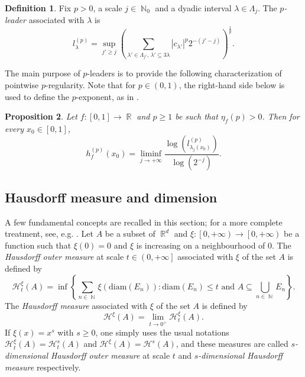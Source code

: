 \documentclass[a4paper,11pt,oneside]{article}
\DeclareMathOperator{\R}{\mathbb{R}}
\DeclareMathOperator{\N}{\mathbb{N}}
\newcommand{\coint}[1]{\left[{#1}\right)}
\newcommand{\ccint}[1]{\left[{#1}\right]}
\newcommand{\ocint}[1]{\left({#1}\right]}
\newcommand{\modu}[1]{\left\vert{#1}\right\vert}
\theoremstyle{definition}
\newtheorem{defi}{Definition}[section]
\theoremstyle{plain}
\newtheorem{prop}[defi]{Proposition}
\begin{document}
\begin{defi}
Fix $p>0$, a scale $j\in\N_0$ and a dyadic interval $\lambda\in\Lambda_j$. The \textit{$p$-leader} associated with $\lambda$ is 
\[
l_\lambda^{(p)}=\sup_{j'\geq j}\left(\sum_{\lambda'\in\Lambda_{j'},\,\lambda'\subseteq 3\lambda}\modu{c_{\lambda'}}^p2^{-(j'-j)}\right)^{\frac{1}{p}}.
\]
\end{defi}

The main purpose of $p$-leaders is to provide the following characterization of pointwise $p$-regularity. Note that for $p\in(0,1)$, the right-hand side below is used to define the $p$-exponent, as in \cite{pLWS}.


\begin{prop}\cite{pexp1,laurent}
Let $f:\ccint{0,1}\rightarrow\R$ and $p\geq 1$ be such that $\eta_f(p)>0$. Then for every $x_0\in\ccint{0,1}$, 
\[
h^{(p)}_f(x_0)
=\liminf_{j\rightarrow+\infty}\frac{\log\left(l_{\lambda_j(x_0)}^{(p)}\right)}{\log \left(2^{-j}\right)}.
\]
\end{prop}



\subsection{Hausdorff measure and dimension}\label{secHaus}


A few fundamental concepts are recalled in this section; for a more complete treatment, see, e.g. \cite{Falconer:86}. Let $A$ be a subset of $\R^d$ and $\xi:\coint{0,+\infty}\rightarrow\coint{0,+\infty}$ be a function such that $\xi(0)=0$ and $\xi$ is increasing on a neighbourhood of 0. The \textit{Hausdorff outer measure} at scale $t\in\ocint{0,+\infty}$ associated with $\xi$ of the set $A$ is defined by
\[
\mathcal{H}_t^\xi(A)=\inf\left\{\sum_{n\in\N}\xi(\text{diam}(E_n)):\text{diam}(E_n)\leq t \text{ and } A\subseteq \bigcup_{n\in\N}E_n\right\}.
\]
The \textit{Hausdorff measure} associated with $\xi$ of the set $A$ is defined by
\[
\mathcal{H}^\xi(A)=\lim_{t\rightarrow0^+}\mathcal{H}^\xi_t(A).
\]
If $\xi(x)= x^s$ with $s\geq 0$, one simply uses the usual notations $\mathcal{H}^\xi_t(A)=\mathcal{H}^s_t(A)$ and \mbox{$\mathcal{H}^\xi(A)=\mathcal{H}^s(A)$}, and these measures are called \textit{$s$-dimensional Hausdorff outer measure} at scale $t$ and \textit{$s$-dimensional Hausdorff measure} respectively.

\medskip
\end{document}
